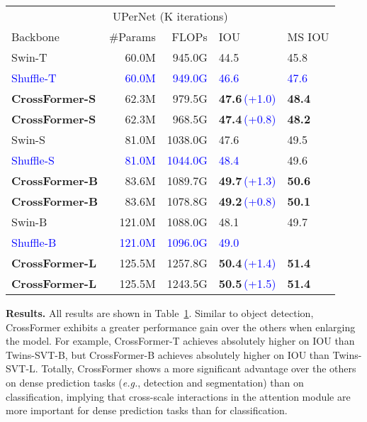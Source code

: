 \documentclass{article} \usepackage{iclr2022_conference,times}
\newcommand{\eg}{{\emph{e.g.}}}
\begin{document}
\begin{table}[]
\begin{subtable}[t]{0.53\textwidth}
{\begin{tabular}{l|rrll}
                \toprule
                \multicolumn{5}{c}{UPerNet (K iterations)} \\
                Backbone & \#Params & FLOPs & IOU & MS IOU\\
                \midrule
                Swin-T & 60.0M & 945.0G & 44.5 & 45.8 \\
                \textcolor{blue}{Shuffle-T} & \textcolor{blue}{60.0M} & \textcolor{blue}{949.0G} & \textcolor{blue}{46.6} & \textcolor{blue}{47.6} \\
                \textbf{CrossFormer-S} & 62.3M & 979.5G & \textbf{47.6}\,\textcolor{blue}{(+1.0)} & \textbf{48.4} \\
                \textbf{CrossFormer-S} & 62.3M & 968.5G & \textbf{47.4}\,\textcolor{blue}{(+0.8)} & \textbf{48.2} \\
                \midrule
                Swin-S & 81.0M & 1038.0G & 47.6 & 49.5 \\
                \textcolor{blue}{Shuffle-S} & \textcolor{blue}{81.0M} & \textcolor{blue}{1044.0G} & \textcolor{blue}{48.4} & 49.6 \\
                \textbf{CrossFormer-B} & 83.6M & 1089.7G  & \textbf{49.7}\,\textcolor{blue}{(+1.3)} & \textbf{50.6} \\
                \textbf{CrossFormer-B} & 83.6M & 1078.8G  & \textbf{49.2}\,\textcolor{blue}{(+0.8)} & \textbf{50.1} \\
                \midrule
                Swin-B & 121.0M & 1088.0G & 48.1 & 49.7 \\
                \textcolor{blue}{Shuffle-B} & \textcolor{blue}{121.0M} & \textcolor{blue}{1096.0G} & \textcolor{blue}{49.0} &  \\
                \textbf{CrossFormer-L} & 125.5M & 1257.8G & \textbf{50.4}\,\textcolor{blue}{(+1.4)} & \textbf{51.4} \\
                \textbf{CrossFormer-L} & 125.5M & 1243.5G & \textbf{50.5}\,\textcolor{blue}{(+1.5)} & \textbf{51.4} \\
                \bottomrule
        \end{tabular}}
    \end{subtable}
    \label{tab:segmentation}
    \vspace{-2mm}
\end{table}

\textbf{Results.} All results are shown in Table~\ref{tab:segmentation}. Similar to object detection, CrossFormer exhibits a greater performance gain over the others when enlarging the model. For example, CrossFormer-T achieves  absolutely higher on IOU than Twins-SVT-B, but CrossFormer-B achieves  absolutely higher on IOU than Twins-SVT-L. Totally, CrossFormer shows a more significant advantage over the others on dense prediction tasks (\eg, detection and segmentation) than on classification, implying  that cross-scale interactions in the attention module are more important for dense prediction tasks than for classification.
\end{document}
